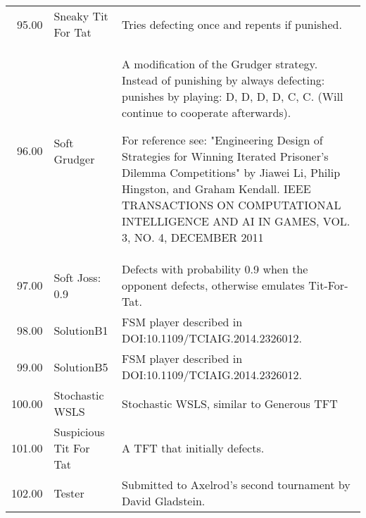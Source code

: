\begin{tabular}{rll}
	95.00  & Sneaky Tit For Tat          & Tries defecting once and repents if punished.                                                                                     \\
	96.00  & Soft Grudger                & A modification of the Grudger strategy. Instead of punishing by always
	defecting: punishes by playing: D, D, D, D, C, C. (Will continue to
	cooperate afterwards).

	For reference see: "Engineering Design of Strategies for Winning
	Iterated Prisoner's Dilemma Competitions" by Jiawei Li, Philip Hingston,
	and Graham Kendall.  IEEE TRANSACTIONS ON COMPUTATIONAL INTELLIGENCE AND AI
	IN GAMES, VOL. 3, NO. 4, DECEMBER 2011                                                                                                                                                                                                                                                                                                                                                                                                                                                                                                                                                                  \\
	97.00  & Soft Joss: 0.9              & Defects with probability 0.9 when the opponent defects, otherwise
	emulates Tit-For-Tat.                                                                                                                                                                                                                                                                                                                                                                                                                                                                                                                                                                                                                                                                                                                                                                                                                                                                                                                              \\
	98.00  & SolutionB1                  & FSM player described in DOI:10.1109/TCIAIG.2014.2326012.                                                                          \\
	99.00  & SolutionB5                  & FSM player described in DOI:10.1109/TCIAIG.2014.2326012.                                                                          \\
	100.00 & Stochastic WSLS             & Stochastic WSLS, similar to Generous TFT                                                                                          \\
	101.00 & Suspicious Tit For Tat      & A TFT that initially defects.                                                                                                     \\
	102.00 & Tester                      & Submitted to Axelrod's second tournament by David Gladstein.


\end{tabular}

